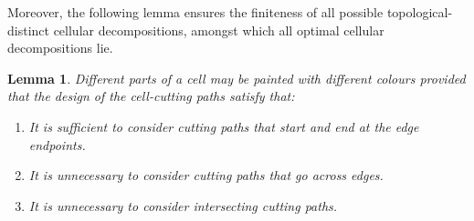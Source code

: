 \documentclass[journal]{IEEEtran}
\newtheorem{lemma}[theorem]{Lemma}
\begin{document}
Moreover, the following lemma ensures the finiteness of all possible topological-distinct cellular decompositions, amongst which all optimal cellular decompositions lie. 
\begin{lemma}\label{lemma:tmech_equiv}
Different parts of a cell may be painted with different colours provided that the design of the cell-cutting paths satisfy that: 
\begin{enumerate}
\item It is sufficient to consider cutting paths that start and end at the edge endpoints. 
\item It is unnecessary to consider cutting paths that go across edges.
\item It is unnecessary to consider intersecting cutting paths. 
\end{enumerate}
\end{lemma}



\end{document}
